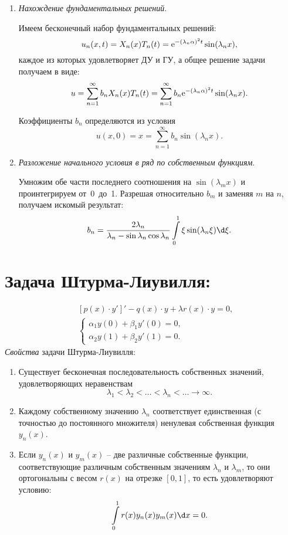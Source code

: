 \begin{enumerate}
    \item \emph{Нахождение фундаментальных решений}.
    
    Имеем бесконечный набор фундаментальных решений:
    \[
        u_n(x, t) = X_n(x)T_n(t) = \mathrm{e}^{-(\lambda_n\alpha)^2t}\sin(\lambda_nx),
    \]
    каждое из которых удовлетворяет ДУ и ГУ, а общее решение задачи получаем в
    виде:
    \[
        u = \sum\limits_{n=1}^\infty b_nX_n(x)T_n(t) = \sum\limits_{n=1}^\infty
        b_n\mathrm{e}^{-(\lambda_n\alpha)^2t}\sin(\lambda_nx).
    \]
    
    Коэффициенты \( b_n \) определяются из условия
    \[
        u(x, 0) = x = \sum\limits_{n=1}^\infty b_n\sin(\lambda_nx).
    \]
    
    \item \emph{Разложение начального условия в ряд по собственным функциям}.
    
    Умножим обе части последнего соотношения на \( \sin(\lambda_mx) \) и
    проинтегрируем от~0~до~1. Разрешая относительно \( b_m \) и заменяя \( m \)
    на \( n \), получаем искомый результат:
    \[
        b_n = \frac{2\lambda_n}{\lambda_n - \sin\lambda_n\cos\lambda_n}
        \int\limits_0^1 \xi\sin(\lambda_n\xi)\d\xi.
    \]
\end{enumerate}

\section{Задача Штурма-Лиувилля:}
\begin{multicols}{2}
\vspace*{-4em}
\begin{align*}
    & [p(x)\cdot y']' - q(x)\cdot y + \lambda r(x)\cdot y = 0 ,\\
    & \left\{ \begin{array}{l}
        \alpha_1 y(0) + \beta_1 y'(0) = 0, \\
        \alpha_2 y(1) + \beta_2 y'(1) = 0.
    \end{array} \right.
\end{align*}
\emph{Свойства} задачи Штурма-Лиувилля:
\begin{enumerate}
    \item Существует бесконечная последовательность собственных значений,
    удовлетворяющих неравенствам
    \[
        \lambda_1 < \lambda_2 < \ldots < \lambda_n < \ldots \to \infty.
    \]
    \item Каждому собственному значению \( \lambda_n \) соответствует
    единственная (с точностью до постоянного множителя) ненулевая собственная
    функция \( y_n(x) \). 
    \item Если \( y_n(x) \) и \( y_m(x) \) -- две различные собственные функции,
    соответствующие различным собственным значениям \( \lambda_n \) и
    \( \lambda_m \), то они ортогональны с весом \( r(x) \) на отрезке
    \( [0, 1] \), то есть удовлетворяют условию:
    \[
        \int\limits_0^1 r(x)y_n(x)y_m(x)\d x = 0.
    \]
\end{enumerate}
\end{multicols}

\newpage
